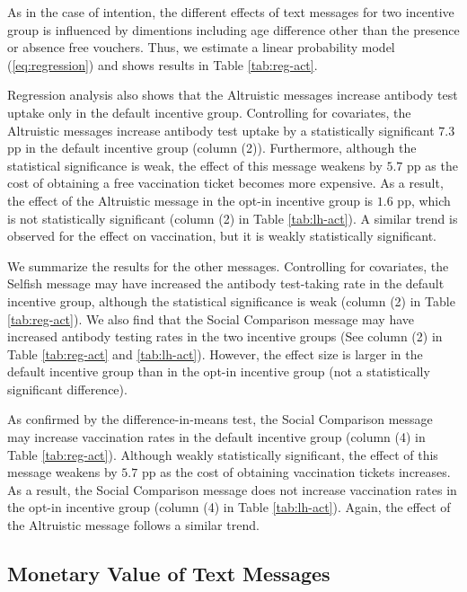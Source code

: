 \documentclass[
]{article}
\begin{document}
As in the case of intention, the different effects of text messages for two incentive group is influenced by dimentions including age difference other than the presence or absence free vouchers. Thus, we estimate a linear probability model (\eqref{eq:regression}) and shows results in Table \ref{tab:reg-act}.

Regression analysis also shows that the Altruistic messages increase antibody test uptake only in the default incentive group. Controlling for covariates, the Altruistic messages increase antibody test uptake by a statistically significant \(7.3\) pp in the default incentive group (column (2)). Furthermore, although the statistical significance is weak, the effect of this message weakens by \(5.7\) pp as the cost of obtaining a free vaccination ticket becomes more expensive. As a result, the effect of the Altruistic message in the opt-in incentive group is \(1.6\) pp, which is not statistically significant (column (2) in Table \ref{tab:lh-act}). A similar trend is observed for the effect on vaccination, but it is weakly statistically significant.

We summarize the results for the other messages. Controlling for covariates, the Selfish message may have increased the antibody test-taking rate in the default incentive group, although the statistical significance is weak (column (2) in Table \ref{tab:reg-act}). We also find that the Social Comparison message may have increased antibody testing rates in the two incentive groups (See column (2) in Table \ref{tab:reg-act} and \ref{tab:lh-act}). However, the effect size is larger in the default incentive group than in the opt-in incentive group (not a statistically significant difference).

As confirmed by the difference-in-means test, the Social Comparison message may increase vaccination rates in the default incentive group (column (4) in Table \ref{tab:reg-act}). Although weakly statistically significant, the effect of this message weakens by \(5.7\) pp as the cost of obtaining vaccination tickets increases. As a result, the Social Comparison message does not increase vaccination rates in the opt-in incentive group (column (4) in Table \ref{tab:lh-act}). Again, the effect of the Altruistic message follows a similar trend.

\hypertarget{monetary-value-of-text-messages}{%
\subsection{Monetary Value of Text Messages}\label{monetary-value-of-text-messages}}
\end{document}
